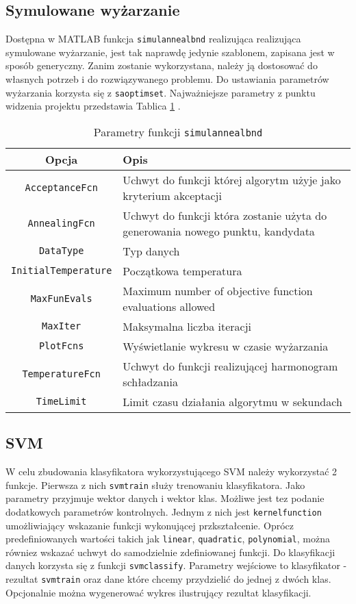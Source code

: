 \documentclass{article}
\begin{document}
\subsection{Symulowane wyżarzanie}
Dostępna w MATLAB funkcja \texttt{simulannealbnd} realizująca realizująca symulowane wyżarzanie, jest tak naprawdę jedynie szablonem, zapisana jest w sposób generyczny. Zanim zostanie wykorzystana, należy ją dostosować do własnych potrzeb i do rozwiązywanego problemu.
Do ustawiania parametrów wyżarzania korzysta się z \texttt{saoptimset}. Najważniejsze parametry z punktu widzenia projektu przedstawia Tablica \ref{tab:saoptimset} .

\begin{table}[h]
\caption{Parametry funkcji \texttt{simulannealbnd}}
\label{tab:saoptimset}
\begin{tabular}{|c|p{7cm}|}
\hline
Opcja & Opis \\ \hline \hline
\texttt{AcceptanceFcn} & Uchwyt do funkcji której algorytm użyje jako kryterium akceptacji \\ \hline
\texttt{AnnealingFcn} & Uchwyt do funkcji która zostanie użyta do generowania nowego punktu, kandydata \\ \hline
\texttt{DataType} & Typ danych \\ \hline
\texttt{InitialTemperature} & Początkowa temperatura \\ \hline
\texttt{MaxFunEvals} & Maximum number of objective function evaluations allowed \\ \hline
\texttt{MaxIter} & Maksymalna liczba iteracji \\ \hline
\texttt{PlotFcns} & Wyświetlanie wykresu w czasie wyżarzania \\ \hline
\texttt{TemperatureFcn} & Uchwyt do funkcji realizującej harmonogram schładzania \\ \hline
\texttt{TimeLimit} & Limit czasu działania algorytmu w sekundach \\ \hline
\end{tabular}
\end{table}


\subsection{SVM}
W celu zbudowania klasyfikatora wykorzystującego SVM należy wykorzystać 2 funkcje. Pierwsza z nich \texttt{svmtrain}  służy trenowaniu klasyfikatora. Jako parametry przyjmuje wektor danych i wektor klas. Możliwe jest tez podanie dodatkowych parametrów kontrolnych. Jednym z nich jest \texttt{kernelfunction} umożliwiający wskazanie funkcji wykonującej przkształcenie. Oprócz predefiniowanych wartości takich jak \texttt{linear}, \texttt{quadratic}, \texttt{polynomial}, można równiez wskazać uchwyt do samodzielnie zdefiniowanej funkcji.
Do klasyfikacji danych korzysta się z funkcji \texttt{svmclassify}. Parametry wejściowe to klasyfikator - rezultat \texttt{svmtrain} oraz dane które chcemy przydzielić do jednej z dwóch klas. Opcjonalnie można wygenerować wykres ilustrujący rezultat klasyfikacji.
\end{document}

